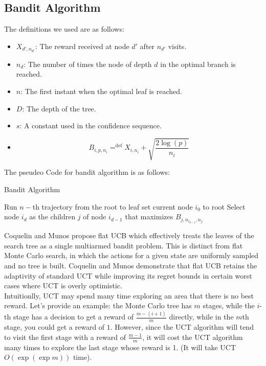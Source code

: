\documentclass{article}
\begin{document}
\subsection{Bandit Algorithm}
The definitions we used are as follows:
\begin{itemize}
    \item \(X_{d',n_{d'}}\): The reward received at node \(d'\) after \(n_{d'}\) visits.
    \item \(n_d\): The number of times the node of depth \(d\) in the optimal branch is reached.
    \item \(n\): The first instant when the optimal leaf is reached.
    \item \(D\): The depth of the tree.
    \item \(s\): A constant used in the confidence sequence.
    \item \[B_{i,p,n_i}=^\text{def}X_{i,n_i}+\sqrt{\frac{2\log(p)}{n_i}}\]
\end{itemize}
The pseudeo Code for bandit algorithm is as follows:
\begin{algorithm}[H]
    \caption{Bandit Algorithm}
    \begin{algorithmic}[1]
            \State Run $n-$th trajectory from the root to leaf
            \State set current node $i_0$ to root
                \State Select node $i_d$ as the children $j$ of node $i_{d-1}$ that maximizes $B_{j,n_{i_{d-1}},n_j}$
            \EndFor
        \EndFor
    \end{algorithmic}
\end{algorithm}
Coquelin and Munos propose ﬂat UCB which effectively treats the leaves of the search tree as a single multiarmed bandit problem.\cite{coquelin2007bandit} This is distinct from ﬂat Monte Carlo search, in which the actions for a given state are uniformly sampled and no tree is built. Coquelin and Munos demonstrate that ﬂat UCB retains the adaptivity of standard UCT while improving its regret
bounds in certain worst cases where UCT is overly optimistic.\\
Intuitionlly, UCT may spend many time exploring an area that there is no best reward. Let's provide an example: the Monte Carlo tree has $m$ stages, while the $i$-th stage has a decision to get a reward of $\frac{m-(i+1)}{m}$ directly, while in the $m$th stage, you could get a reward of $1$. However, since the UCT algorithm will tend to visit the first stage with a reward of $\frac{m-1}{m}$, it will cost the UCT algorithm many times to explore the last stage whose reward is 1. (It will take UCT $O(\exp(\exp m))$ time).\\
\end{document}
